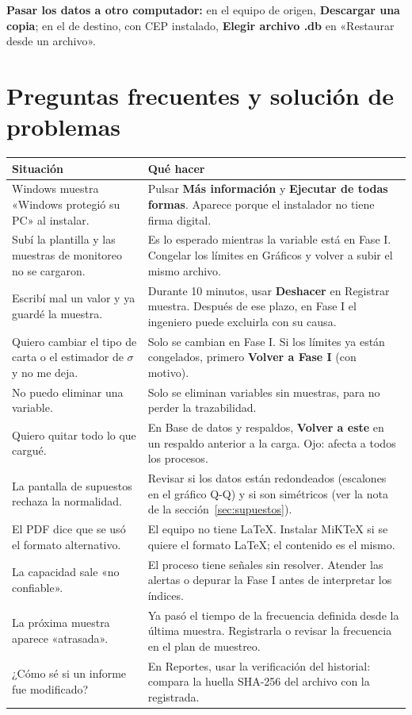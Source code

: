 \documentclass[11pt,a4paper]{article}
\newcommand{\boton}[1]{\textbf{#1}}                      %
\newcommand{\campo}[1]{«#1»}                             %
\begin{document}
\textbf{Pasar los datos a otro computador:} en el equipo de origen, \boton{Descargar una copia}; en
el de destino, con CEP instalado, \boton{Elegir archivo .db} en \campo{Restaurar desde un archivo}.

\section{Preguntas frecuentes y solución de problemas}

\begin{tabularx}{\linewidth}{@{}P{5.2cm}L@{}}
\toprule
\textbf{Situación} & \textbf{Qué hacer}\\
\midrule
Windows muestra \campo{Windows protegió su PC} al instalar. & Pulsar \boton{Más información} y \boton{Ejecutar de todas formas}. Aparece porque el instalador no tiene firma digital.\\
Subí la plantilla y las muestras de monitoreo no se cargaron. & Es lo esperado mientras la variable está en Fase I. Congelar los límites en Gráficos y volver a subir el mismo archivo.\\
Escribí mal un valor y ya guardé la muestra. & Durante 10 minutos, usar \boton{Deshacer} en Registrar muestra. Después de ese plazo, en Fase I el ingeniero puede excluirla con su causa.\\
Quiero cambiar el tipo de carta o el estimador de $\sigma$ y no me deja. & Solo se cambian en Fase I. Si los límites ya están congelados, primero \boton{Volver a Fase I} (con motivo).\\
No puedo eliminar una variable. & Solo se eliminan variables sin muestras, para no perder la trazabilidad.\\
Quiero quitar todo lo que cargué. & En Base de datos y respaldos, \boton{Volver a este} en un respaldo anterior a la carga. Ojo: afecta a todos los procesos.\\
La pantalla de supuestos rechaza la normalidad. & Revisar si los datos están redondeados (escalones en el gráfico Q-Q) y si son simétricos (ver la nota de la sección~\ref{sec:supuestos}).\\
El PDF dice que se usó el formato alternativo. & El equipo no tiene LaTeX. Instalar MiKTeX si se quiere el formato LaTeX; el contenido es el mismo.\\
La capacidad sale \campo{no confiable}. & El proceso tiene señales sin resolver. Atender las alertas o depurar la Fase I antes de interpretar los índices.\\
La próxima muestra aparece \campo{atrasada}. & Ya pasó el tiempo de la frecuencia definida desde la última muestra. Registrarla o revisar la frecuencia en el plan de muestreo.\\
¿Cómo sé si un informe fue modificado? & En Reportes, usar la verificación del historial: compara la huella SHA-256 del archivo con la registrada.\\
\bottomrule
\end{tabularx}
\end{document}
